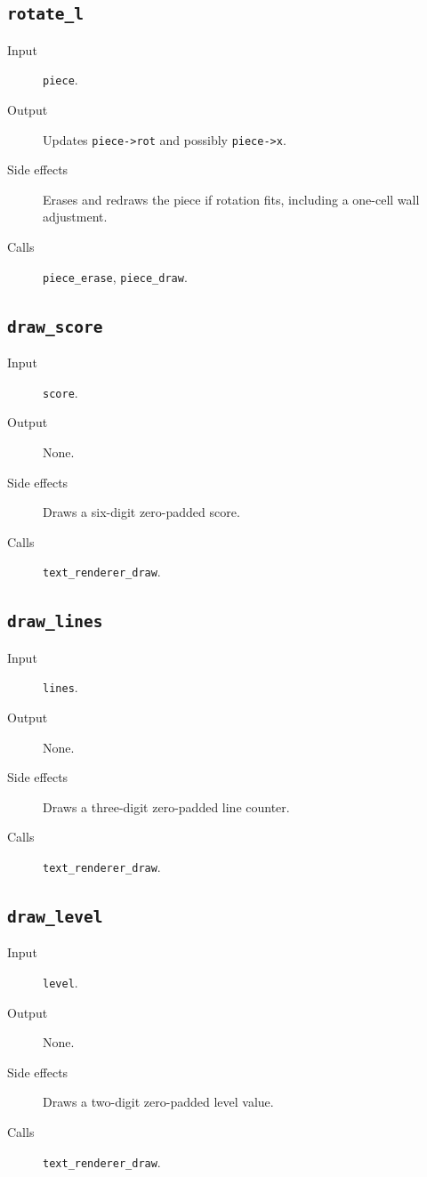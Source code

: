 \subsection*{\texttt{rotate\_l}}
\begin{description}
  \item[Input] \texttt{piece}.
  \item[Output] Updates \texttt{piece->rot} and possibly \texttt{piece->x}.
  \item[Side effects] Erases and redraws the piece if rotation fits, including a one-cell wall adjustment.
  \item[Calls] \texttt{piece\_erase}, \texttt{piece\_draw}.
\end{description}

\subsection*{\texttt{draw\_score}}
\begin{description}
  \item[Input] \texttt{score}.
  \item[Output] None.
  \item[Side effects] Draws a six-digit zero-padded score.
  \item[Calls] \texttt{text\_renderer\_draw}.
\end{description}

\subsection*{\texttt{draw\_lines}}
\begin{description}
  \item[Input] \texttt{lines}.
  \item[Output] None.
  \item[Side effects] Draws a three-digit zero-padded line counter.
  \item[Calls] \texttt{text\_renderer\_draw}.
\end{description}

\subsection*{\texttt{draw\_level}}
\begin{description}
  \item[Input] \texttt{level}.
  \item[Output] None.
  \item[Side effects] Draws a two-digit zero-padded level value.
  \item[Calls] \texttt{text\_renderer\_draw}.
\end{description}

